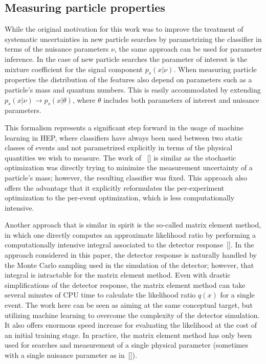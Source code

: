 \documentclass[aoas,preprint]{imsart}
\newcommand{\citek}[1]{[\cite{#1}]}
\numberwithin{equation}{section}
\theoremstyle{plain}
\begin{document}
\subsection{Measuring particle properties}

While the original motivation for this work was to improve the treatment of systematic uncertainties in new particle searches by parametrizing the classifier in terms of the nuisance parameters $\nu$, the same approach can be used for parameter inference. In the case of new particle searches the parameter of interest is the mixture coefficient for the signal component $p_s(x|\nu)$. When measuring particle properties the distribution of the features also depend on parameters such as a particle's mass and quantum numbers. This is easily accommodated by extending $p_s(x|\nu) \to p_s(x|\theta)$, where $\theta$ includes both parameters of interest and nuisance parameters. 

This formalism represents a significant step forward in the usage of machine learning in HEP, where classifiers have always been used between two static classes of events and not parametrized explicitly in terms of the physical quantities we wish to measure. The work of  ~\citek{Whiteson:2006ws} is similar as the stochastic optimization was directly trying to minimize the measurement uncertainty of a particle's mass; however, the resulting classifier was fixed. This approach also offers the advantage that it explicitly reformulates the per-experiment optimization to the per-event optimization, which is less computationally intensive.

Another approach that is similar in spirit is the so-called matrix element method, in which one  directly computes an approximate likelihood ratio by performing a computationally intensive integral associated to the detector response~\citek{Volobouev:2011vb}. In the approach considered in this paper, the detector response is naturally handled by the Monte Carlo sampling used in the simulation of the detector; however, that integral is intractable for the matrix element method. Even with drastic simplifications of the detector response, the matrix element method can take several minutes of CPU time to calculate the likelihood ratio $q(x)$ for a single event. The work here can be seen as aiming at the same conceptual target, but utilizing machine learning to overcome the complexity of the detector simulation. It also offers enormous speed increase for evaluating the likelihood at the cost of an initial training stage. In practice, the matrix element method has only been used for searches and measurement of a single physical parameter (sometimes with a single nuisance parameter as in~\citek{Aaltonen:2010yz}).
\end{document}
